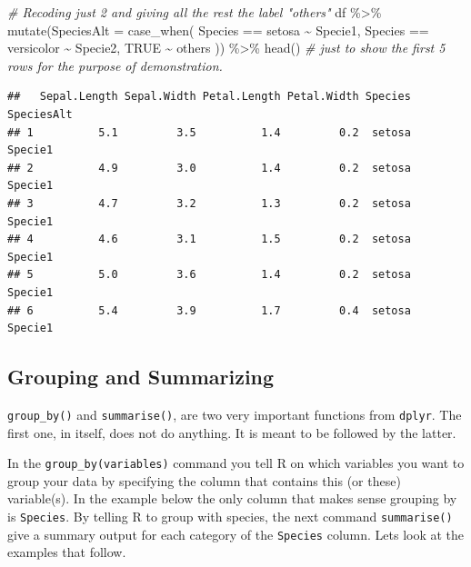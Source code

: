 \documentclass[
]{book}
\newenvironment{Shaded}{\begin{snugshade}}{\end{snugshade}}
\newcommand{\AttributeTok}[1]{\textcolor[rgb]{0.77,0.63,0.00}{#1}}
\newcommand{\CommentTok}[1]{\textcolor[rgb]{0.56,0.35,0.01}{\textit{#1}}}
\newcommand{\ConstantTok}[1]{\textcolor[rgb]{0.00,0.00,0.00}{#1}}
\newcommand{\FunctionTok}[1]{\textcolor[rgb]{0.00,0.00,0.00}{#1}}
\newcommand{\NormalTok}[1]{#1}
\newcommand{\SpecialCharTok}[1]{\textcolor[rgb]{0.00,0.00,0.00}{#1}}
\newcommand{\StringTok}[1]{\textcolor[rgb]{0.31,0.60,0.02}{#1}}
\begin{document}
\begin{Shaded}
\begin{Highlighting}[]
\CommentTok{\# Recoding just 2 and giving all the rest the label "others"}
\NormalTok{df }\SpecialCharTok{\%\textgreater{}\%} 
  \FunctionTok{mutate}\NormalTok{(}\AttributeTok{SpeciesAlt =} \FunctionTok{case\_when}\NormalTok{(}
\NormalTok{    Species }\SpecialCharTok{==} \StringTok{\textquotesingle{}setosa\textquotesingle{}} \SpecialCharTok{\textasciitilde{}} \StringTok{\textquotesingle{}Specie1\textquotesingle{}}\NormalTok{,}
\NormalTok{    Species }\SpecialCharTok{==} \StringTok{\textquotesingle{}versicolor\textquotesingle{}} \SpecialCharTok{\textasciitilde{}} \StringTok{\textquotesingle{}Specie2\textquotesingle{}}\NormalTok{,}
    \ConstantTok{TRUE} \SpecialCharTok{\textasciitilde{}} \StringTok{\textquotesingle{}others\textquotesingle{}}
\NormalTok{  )) }\SpecialCharTok{\%\textgreater{}\%} 
  \FunctionTok{head}\NormalTok{()  }\CommentTok{\# just to show the first 5 rows for the purpose of demonstration.}
\end{Highlighting}
\end{Shaded}

\begin{verbatim}
##   Sepal.Length Sepal.Width Petal.Length Petal.Width Species SpeciesAlt
## 1          5.1         3.5          1.4         0.2  setosa    Specie1
## 2          4.9         3.0          1.4         0.2  setosa    Specie1
## 3          4.7         3.2          1.3         0.2  setosa    Specie1
## 4          4.6         3.1          1.5         0.2  setosa    Specie1
## 5          5.0         3.6          1.4         0.2  setosa    Specie1
## 6          5.4         3.9          1.7         0.4  setosa    Specie1
\end{verbatim}

\hypertarget{grouping-and-summarizing}{%
\subsection{Grouping and Summarizing}\label{grouping-and-summarizing}}

\texttt{group\_by()} and \texttt{summarise()}, are two very important functions from \texttt{dplyr}.
The first one, in itself, does not do anything.
It is meant to be followed by the latter.

In the \texttt{group\_by(variables)} command you tell R on which variables you want to group your data by specifying the column that contains this (or these) variable(s).
In the example below the only column that makes sense grouping by is \texttt{Species}.
By telling R to group with species, the next command \texttt{summarise()} give a summary output for each category of the \texttt{Species} column.
Lets look at the examples that follow.
\end{document}
